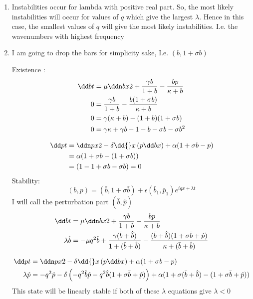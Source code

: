 \documentclass{X:/Documents/Coding/Latex/myassignment}
\begin{document}
\begin{enumerate}
\begin{enumerate}
		\item Instabilities occur for lambda with positive real part. So, the most likely instabilities will occur for values of $q$ which give the largest $\lambda$. Hence in this case, the smallest values of $q$ will give the most likely instabilities. I.e. the wavenumbers with highest frequency 
		\item I am going to drop the bars for simplicity sake, I.e. $(b,1+\sigma b)$

		Existence :
		\begin{align*}
			\dd bt &= \mu \ddn bx2 + \frac{\gamma b}{1+ b} - \frac{b p }{\kappa + b}\\
			0 &= \frac{\gamma b}{1+ b} - \frac{b(1+ \sigma b)}{\kappa + b}\\
			0 &= \gamma(\kappa + b)  - (1+b)(1+ \sigma b)\\
			0 &= \gamma \kappa +\gamma b  - 1 - b - \sigma b - \sigma b^2 \\
		\end{align*}

		\begin{align*}
			\dd pt &= \ddn px2 - \delta \dd{}x \left(p \dd bx\right) + \alpha (1 + \sigma b -p)\\
			 &= \alpha (1 + \sigma b -(1 + \sigma b))\\
			 &= (1 -1 +\sigma b - \sigma b) = 0
		\end{align*}
		Stability:
		\[(b, p) = (\bar b, 1 + \sigma \bar b) + \epsilon (\bar b_1, \bar p_1) e^{iqx + \lambda t}\]
		I will call the perturbation part $(\hat b, \hat p)$
		\begin{align*}
			\dd bt &= \mu \ddn bx2 + \frac{\gamma b}{1+ b} - \frac{b p }{\kappa + b}\\
			\lambda \hat b &= -\mu q^2 \hat b + \frac{\gamma (\bar b + \hat b)}{1+ (\bar b + \hat b)} - \frac{(\bar b + \hat b)(1 + \sigma \bar b + \hat p) }{\kappa + (\bar b + \hat b)}\\
		\end{align*}

		\begin{align*}
			\dd pt &=  \ddn px2 - \delta \dd{}x \left(p \dd bx\right) + \alpha (1 + \sigma b -p)\\
			\lambda \hat p &= -q^2 \hat p - \delta \left(-q^2\hat{b}\hat{p}  - q^2 \hat{b}(1 + \sigma\bar{b} + \hat{p})\right) + \alpha (1 + \sigma (\bar{b} + \hat{b}) -(1 + \sigma \bar{b} +\hat{p}))
		\end{align*}
		This state will be linearly stable if both of these $\lambda$ equations give  $\lambda < 0$


\end{enumerate}
\end{enumerate}
\end{document}
